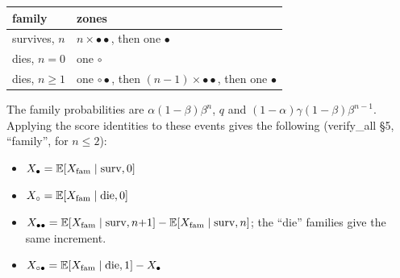 \documentclass[10pt,]{article}
\providecommand{\tightlist}{%
  \setlength{\itemsep}{0pt}\setlength{\parskip}{0pt}}
\begin{document}
\begin{longtable}[]{@{}ll@{}}
\toprule
\begin{minipage}[b]{0.47\columnwidth}\raggedright
family\strut
\end{minipage} & \begin{minipage}[b]{0.47\columnwidth}\raggedright
zones\strut
\end{minipage}\tabularnewline
\midrule
\endhead
\begin{minipage}[t]{0.47\columnwidth}\raggedright
survives, \(n\)\strut
\end{minipage} & \begin{minipage}[t]{0.47\columnwidth}\raggedright
\(n\times\bullet\bullet\), then one \(\bullet\)\strut
\end{minipage}\tabularnewline
\begin{minipage}[t]{0.47\columnwidth}\raggedright
dies, \(n=0\)\strut
\end{minipage} & \begin{minipage}[t]{0.47\columnwidth}\raggedright
one \(\circ\)\strut
\end{minipage}\tabularnewline
\begin{minipage}[t]{0.47\columnwidth}\raggedright
dies, \(n\ge1\)\strut
\end{minipage} & \begin{minipage}[t]{0.47\columnwidth}\raggedright
one \(\circ\bullet\), then \((n-1)\times\bullet\bullet\), then one
\(\bullet\)\strut
\end{minipage}\tabularnewline
\bottomrule
\end{longtable}

The family probabilities are \(\alpha(1-\beta)\beta^n\), \(q\) and
\((1-\alpha)\gamma(1-\beta)\beta^{n-1}\). Applying the score identities
to these events gives the following (verify\_all §5, ``family'', for
\(n\le2\)):

\begin{itemize}
\tightlist
\item
  \(X_\bullet=\mathbb E[X_{\rm fam}\mid\text{surv},0]\)
\item
  \(X_\circ=\mathbb E[X_{\rm fam}\mid\text{die},0]\)
\item
  \(X_{\bullet\bullet}=\mathbb E[X_{\rm fam}\mid\text{surv},n{+}1]-\mathbb E[X_{\rm fam}\mid\text{surv},n]\);
  the ``die'' families give the same increment.
\item
  \(X_{\circ\bullet}=\mathbb E[X_{\rm fam}\mid\text{die},1]-X_\bullet\)
\end{itemize}
\end{document}
